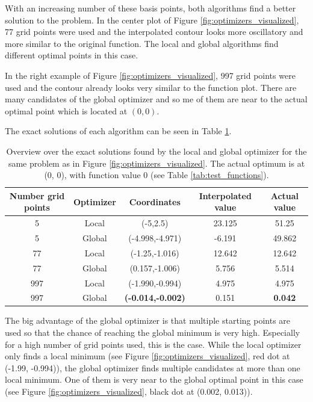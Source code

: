 With an increasing number of these basis points, both algorithms find a better solution to the problem. In the center plot of Figure \ref{fig:optimizers_visualized}, 77 grid points were used and the interpolated contour looks more oscillatory and more similar to the original function. The local and global algorithms find different optimal points in this case. 

In the right example of Figure \ref{fig:optimizers_visualized}, 997 grid points were used and the contour already looks very similar to the function plot. There are many candidates of the global optimizer and so	me of them are near to the actual optimal point which is located at $ (0, 0) $. 


The exact solutions of each algorithm can be seen in Table \ref{tab:optimizer_vis_function}.
\begin{table}[H]
	\caption{ Overview over the exact solutions found by the local and global optimizer for the same problem as in Figure \ref{fig:optimizers_visualized}. The actual optimum is at (0, 0), with function value 0 (see Table \ref{tab:test_functions}).}
	\label{tab:optimizer_vis_function}
	\centering
	\begin{tabular}{|c c c c c|} 
		\hline
		Number grid points & Optimizer & Coordinates & Interpolated value & Actual value \\
		\hline
		5 & Local &  (-5,2.5)  &  23.125  &  51.25  \\
		5 & Global &  (-4.998,-4.971)  &  -6.191  &  49.862  \\
		77 & Local &  (-1.25,-1.016)  &  12.642  &  12.642  \\
		77 & Global &  (0.157,-1.006)  &  5.756  &  5.514  \\
		997 & Local &  (-1.990,-0.994)  &  4.975  &  4.975  \\
		997 & Global & \textbf{(-0.014,-0.002)} & 0.151 & \textbf{0.042} \\
		\hline
	\end{tabular}
\end{table}

The big advantage of the global optimizer is that multiple starting points are used so that the chance of reaching the global minimum is very high. Especially for a high number of grid points used, this is the case. While the local optimizer only finds a local minimum (see Figure \ref{fig:optimizers_visualized}, red dot at (-1.99, -0.994)), the global optimizer finds multiple candidates at more than one local minimum. One of them is very near to the global optimal point in this case (see Figure \ref{fig:optimizers_visualized}, black dot at (0.002, 0.013)). \newline 



